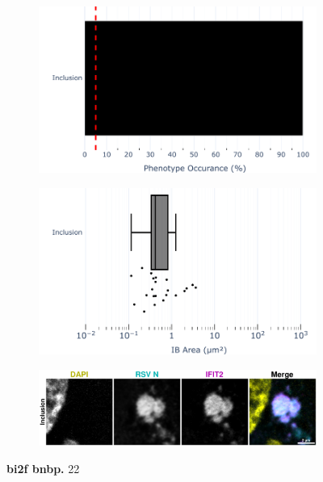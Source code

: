 \begin{figure}
    \begin{subfigure}{0.495\textwidth}
        \caption{}
        \includegraphics[width=1\linewidth]{10. Chapter 5/Figs/03. IFIT2-FLAG/03. IFIT2F/01. pIB/07. bar_bi2f_bnbp.pdf} 
    \end{subfigure}
    \begin{subfigure}{0.495\textwidth}
        \caption{}
        \includegraphics[width=1\linewidth]{10. Chapter 5/Figs/03. IFIT2-FLAG/03. IFIT2F/01. pIB/08. box_bi2f_bnbp.pdf}
    \end{subfigure}
    \begin{subfigure}{1\textwidth}
        \centering
        \caption{}
        \includegraphics[width=1\linewidth]{10. Chapter 5/Figs/03. IFIT2-FLAG/03. IFIT2F/01. pIB/09. bi2f-bnbp.pdf}
    \end{subfigure}
    \caption[bi2f bnbp]{\textbf{bi2f bnbp.} 22}
    \label{fig:bi2f bnbp}
\end{figure}


